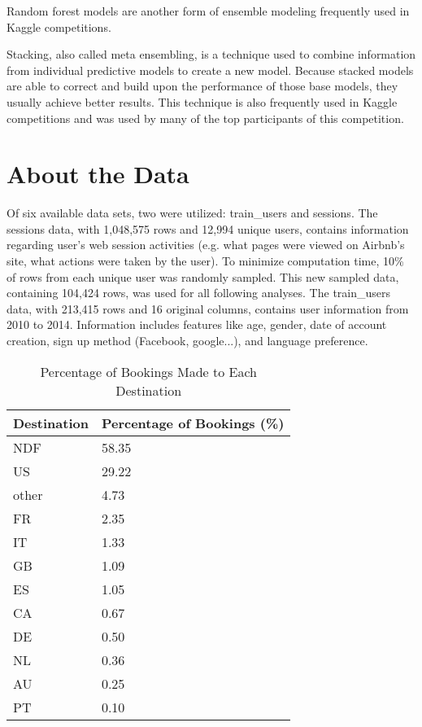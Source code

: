 \documentclass{article}
\begin{document}
Random forest models are another form of ensemble modeling frequently used in Kaggle competitions. 

Stacking, also called meta ensembling, is a technique used to combine information from individual predictive 
models to create a new model. Because stacked models are able to correct and build upon the performance of those
base models, they usually achieve better results. This technique is also frequently used in Kaggle competitions
and was used by many of the top participants of this competition. 


\section{About the Data}

Of six available data sets, two were utilized: train\_users and sessions. The sessions data, with 1,048,575 rows and 12,994 unique users, contains information regarding user's web session activities (e.g. what pages were viewed on Airbnb's site, what actions were taken by the user). To minimize computation time, 10\% of rows from each unique user was randomly sampled. This new sampled data, containing 104,424 rows, was used for all following analyses. The train\_users data, with 213,415 rows and 16 original columns, contains user information from 2010 to 2014. Information includes features like age, gender, date of account creation, sign up method (Facebook, google...), and language preference. 

\begin{table}[ht]
\centering
\begin{tabular}{| l |l |}
  \hline
  \textbf{Destination} & \textbf{Percentage of Bookings (\%)} \\ 
  \hline
  NDF & 58.35 \\ 
  US & 29.22 \\ 
  other & 4.73 \\ 
  FR & 2.35 \\ 
  IT & 1.33 \\ 
  GB & 1.09 \\ 
  ES & 1.05 \\ 
  CA & 0.67 \\ 
  DE & 0.50 \\ 
  NL & 0.36 \\ 
  AU & 0.25 \\ 
  PT & 0.10 \\ 
   \hline
\end{tabular}
\caption{Percentage of Bookings Made to Each Destination}
\label{table:countries}
\end{table}
\end{document}
